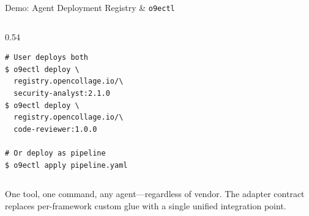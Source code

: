 \begin{frame}[fragile]{Demo: Agent Deployment Registry \& \texttt{o9ectl}}
\begin{columns}[T]
\begin{column}{0.54\textwidth}
\begin{lstlisting}
# User deploys both
$ o9ectl deploy \
  registry.opencollage.io/\
  security-analyst:2.1.0
$ o9ectl deploy \
  registry.opencollage.io/\
  code-reviewer:1.0.0

# Or deploy as pipeline
$ o9ectl apply pipeline.yaml
      \end{lstlisting}
    \end{column}
  \end{columns}

  \vspace{-0.4cm}

  \begin{exampleblock}{}
    \centering\scriptsize
    One tool, one command, any agent---regardless of vendor.
    The adapter contract replaces per-framework custom glue with a single unified integration point.
  \end{exampleblock}
\end{frame}
